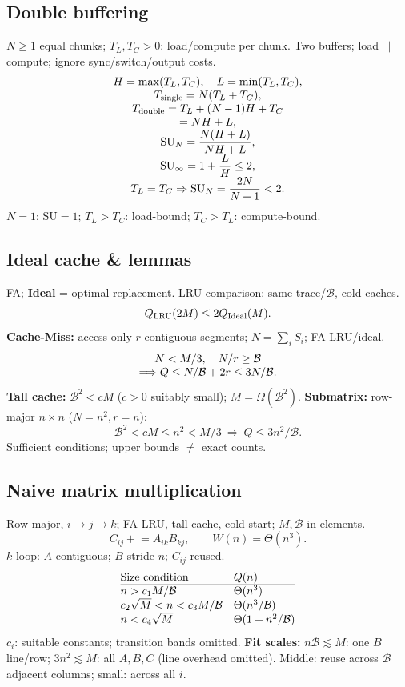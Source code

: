\subsection{Double buffering}
$N\ge1$ equal chunks; $T_L,T_C>0$: load/compute per chunk.
Two buffers; load $\parallel$ compute; ignore sync/switch/output costs.
\[
\begin{array}{@{}c@{}}
H=\max(T_L,T_C),\quad L=\min(T_L,T_C),\\
T_{\rm single}=N(T_L+T_C),\\
T_{\rm double}=T_L+(N-1)H+T_C\\
=NH+L,\\
\mathrm{SU}_N=\dfrac{N(H+L)}{NH+L},\\
\mathrm{SU}_{\infty}=1+\dfrac LH\le2,\\
T_L=T_C\Rightarrow\mathrm{SU}_N=\dfrac{2N}{N+1}<2.
\end{array}
\]
$N=1$: $\mathrm{SU}=1$;
$T_L>T_C$: load-bound; $T_C>T_L$: compute-bound.

\subsection{Ideal cache \& lemmas}
FA; \textbf{Ideal} = optimal replacement.
LRU comparison: same trace/$\mathcal B$, cold caches.
\[
Q_{\rm LRU}(2M)\le2Q_{\rm Ideal}(M).
\]
\textbf{Cache-Miss:} access only $r$ contiguous segments;
$N=\sum_iS_i$; FA LRU/ideal.
\[
\begin{array}{@{}c@{}}
N<M/3,\quad N/r\ge\mathcal B\\
\Longrightarrow Q\le N/\mathcal B+2r\le3N/\mathcal B.
\end{array}
\]
\textbf{Tall cache:} $\mathcal B^2<cM$ ($c>0$ suitably small);
$M=\Omega(\mathcal B^2)$.
\textbf{Submatrix:} row-major $n\times n$ ($N=n^2,r=n$):
\[
\mathcal B^2<cM\le n^2<M/3
\ \Longrightarrow\ Q\le3n^2/\mathcal B.
\]
Sufficient conditions; upper bounds $\ne$ exact counts.

\subsection{Naive matrix multiplication}
Row-major, $i\to j\to k$; FA-LRU, tall cache, cold start;
$M,\mathcal B$ in elements.
\[
C_{ij}\mathrel{+}=A_{ik}B_{kj},\qquad W(n)=\Theta(n^3).
\]
$k$-loop: $A$ contiguous; $B$ stride $n$; $C_{ij}$ reused.
\[
\begin{array}{@{}l@{\quad}l@{}}
\text{Size condition}&Q(n)\\\hline
n>c_1M/\mathcal B&\Theta(n^3)\\
c_2\sqrt M<n<c_3M/\mathcal B&\Theta(n^3/\mathcal B)\\
n<c_4\sqrt M&\Theta(1+n^2/\mathcal B)
\end{array}
\]
$c_i$: suitable constants; transition bands omitted.
\textbf{Fit scales:} $n\mathcal B\lesssim M$: one $B$ line/row;
$3n^2\lesssim M$: all $A,B,C$ (line overhead omitted).
Middle: reuse across $\mathcal B$ adjacent columns; small: across all $i$.


